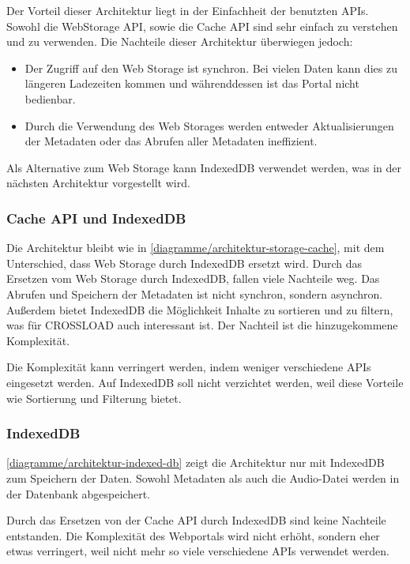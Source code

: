 Der Vorteil dieser Architektur liegt in der Einfachheit der benutzten \acp{API}. Sowohl die WebStorage \ac{API}, sowie die Cache \ac{API} sind sehr einfach zu verstehen und zu verwenden. Die Nachteile dieser Architektur überwiegen jedoch:

\begin{itemize}
\item Der Zugriff auf den Web Storage ist synchron. Bei vielen Daten kann dies zu längeren Ladezeiten kommen und währenddessen ist das Portal nicht bedienbar. 
\item Durch die Verwendung des Web Storages werden entweder Aktualisierungen der Metadaten oder das Abrufen aller Metadaten ineffizient. 
\end{itemize}

Als Alternative zum Web Storage kann IndexedDB verwendet werden, was in der nächsten Architektur vorgestellt wird.

\subsubsection{Cache API und IndexedDB}
Die Architektur bleibt wie in \autoref{diagramme/architektur-storage-cache}, mit dem Unterschied, dass Web Storage durch IndexedDB ersetzt wird. Durch das Ersetzen vom Web Storage durch IndexedDB, fallen viele Nachteile weg. Das Abrufen und Speichern der Metadaten ist nicht synchron, sondern asynchron. Außerdem bietet IndexedDB die Möglichkeit Inhalte zu sortieren und zu filtern, was für CROSSLOAD auch interessant ist. Der Nachteil ist die hinzugekommene Komplexität. 

Die Komplexität kann verringert werden, indem weniger verschiedene \acp{API} eingesetzt werden. Auf IndexedDB soll nicht verzichtet werden, weil diese Vorteile wie Sortierung und Filterung bietet. 

\subsubsection{IndexedDB}
\autoref{diagramme/architektur-indexed-db} zeigt die Architektur nur mit IndexedDB zum Speichern der Daten. Sowohl Metadaten als auch die Audio-Datei werden in der Datenbank abgespeichert. 


Durch das Ersetzen von der Cache \ac{API} durch IndexedDB sind keine Nachteile entstanden. Die Komplexität des Webportals wird nicht erhöht, sondern eher etwas verringert, weil nicht mehr so viele verschiedene \acp{API} verwendet werden.

